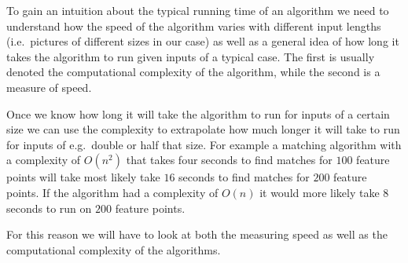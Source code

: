 To gain an intuition about the typical running time of an algorithm we 
need to understand how the speed of the algorithm varies with different 
input lengths (i.e.\ pictures of different sizes in our case) as well as 
a general idea of how long it takes the algorithm to run given inputs of
a typical case. The first is usually denoted the computational 
complexity of the algorithm, while the second is a measure of speed.

Once we know how long it will take the algorithm to run for inputs of a 
certain size we can use the complexity to extrapolate how much longer it
will take to run for inputs of e.g.\ double or half that size. For 
example a matching algorithm with a complexity of $O(n^2)$ that takes 
four seconds to find matches for $100$ feature points will take most 
likely take $16$ seconds to find matches for $200$ feature points. If 
the algorithm had a complexity of $O(n)$ it would more likely take $8$ 
seconds to run on $200$ feature points.

For this reason we will have to look at both the measuring speed as well
as the computational complexity of the algorithms.


